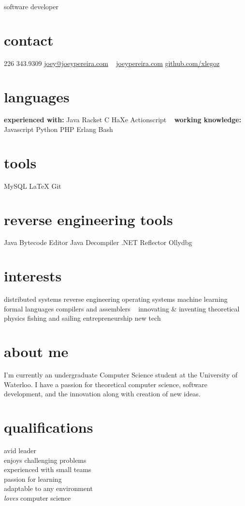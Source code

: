 \documentclass[]{friggeri-cv-short}
\begin{document}
       {software developer}

\begin{aside}
  \section{contact}
    226 343.9309
    \href{mailto:joey@joeypereira.com}{joey@joeypereira.com}
    ~
    \href{http://joeypereira.com}{joeypereira.com}
    \href{http://www.github.com/xlegoz}{github.com/xlegoz}
  \section{languages}
  \textbf{experienced with:}
  	Java
  	Racket
  	C
  	HaXe
  	Actionscript
	~
	\textbf{working knowledge:}
	Javascript
	Python
  	PHP
	Erlang
	Bash
  \section{tools}
    MySQL
    \LaTeX
	Git
  \section{reverse engineering tools}
  	Java Bytecode Editor
  	Java Decompiler
  	.NET Reflector
  	Ollydbg
  \section{interests}
  	distributed systems
  	reverse engineering
  	operating systems
  	machine learning
  	formal languages
  	compilers and assemblers
  	~
	innovating \& inventing
  	theoretical physics
  	fishing and sailing
  	entrepreneurship
  	new tech
\end{aside}


\section{about me}
I'm currently an undergraduate Computer Science student at the University of Waterloo. I have a passion for theoretical computer science, software development, and the innovation along with creation of new ideas.
\section{qualifications}
\begin{multicols}{3}
 avid leader \\ enjoys challenging problems \\ experienced with small teams \\ passion for learning \\ adaptable to any environment \\ {\em loves} computer science
\end{multicols}
\end{document}
